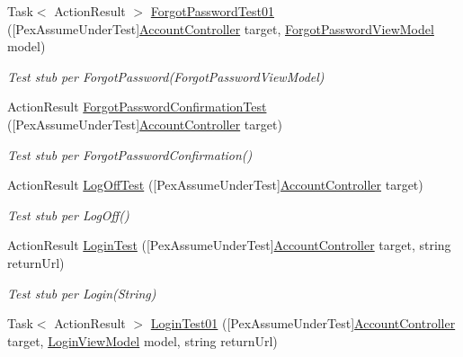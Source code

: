 \begin{DoxyCompactItemize}
Task$<$ Action\+Result $>$ \mbox{\hyperlink{class_brew_day2_1_1_tests_1_1_account_controller_test_a11dd2465f4643196ccf6b56cf41d7841}{Forgot\+Password\+Test01}} (\mbox{[}Pex\+Assume\+Under\+Test\mbox{]}\mbox{\hyperlink{class_brew_day2_1_1_controllers_1_1_account_controller}{Account\+Controller}} target, \mbox{\hyperlink{class_brew_day2_1_1_models_1_1_forgot_password_view_model}{Forgot\+Password\+View\+Model}} model)
\begin{DoxyCompactList}\small\item\em Test stub per Forgot\+Password(\+Forgot\+Password\+View\+Model)\end{DoxyCompactList}\item 
Action\+Result \mbox{\hyperlink{class_brew_day2_1_1_tests_1_1_account_controller_test_ad0d4e3379fe8981cd560ca7c0505a88f}{Forgot\+Password\+Confirmation\+Test}} (\mbox{[}Pex\+Assume\+Under\+Test\mbox{]}\mbox{\hyperlink{class_brew_day2_1_1_controllers_1_1_account_controller}{Account\+Controller}} target)
\begin{DoxyCompactList}\small\item\em Test stub per Forgot\+Password\+Confirmation()\end{DoxyCompactList}\item 
Action\+Result \mbox{\hyperlink{class_brew_day2_1_1_tests_1_1_account_controller_test_a6e662e28d87176f7ba2fb82b568d3b17}{Log\+Off\+Test}} (\mbox{[}Pex\+Assume\+Under\+Test\mbox{]}\mbox{\hyperlink{class_brew_day2_1_1_controllers_1_1_account_controller}{Account\+Controller}} target)
\begin{DoxyCompactList}\small\item\em Test stub per Log\+Off()\end{DoxyCompactList}\item 
Action\+Result \mbox{\hyperlink{class_brew_day2_1_1_tests_1_1_account_controller_test_a9efb7c2ba333eec5dd14ca466a7a6efe}{Login\+Test}} (\mbox{[}Pex\+Assume\+Under\+Test\mbox{]}\mbox{\hyperlink{class_brew_day2_1_1_controllers_1_1_account_controller}{Account\+Controller}} target, string return\+Url)
\begin{DoxyCompactList}\small\item\em Test stub per Login(\+String)\end{DoxyCompactList}\item 
Task$<$ Action\+Result $>$ \mbox{\hyperlink{class_brew_day2_1_1_tests_1_1_account_controller_test_ac637e7e25738670cc0a15d98e293dbe9}{Login\+Test01}} (\mbox{[}Pex\+Assume\+Under\+Test\mbox{]}\mbox{\hyperlink{class_brew_day2_1_1_controllers_1_1_account_controller}{Account\+Controller}} target, \mbox{\hyperlink{class_brew_day2_1_1_models_1_1_login_view_model}{Login\+View\+Model}} model, string return\+Url)

\end{DoxyCompactItemize}
